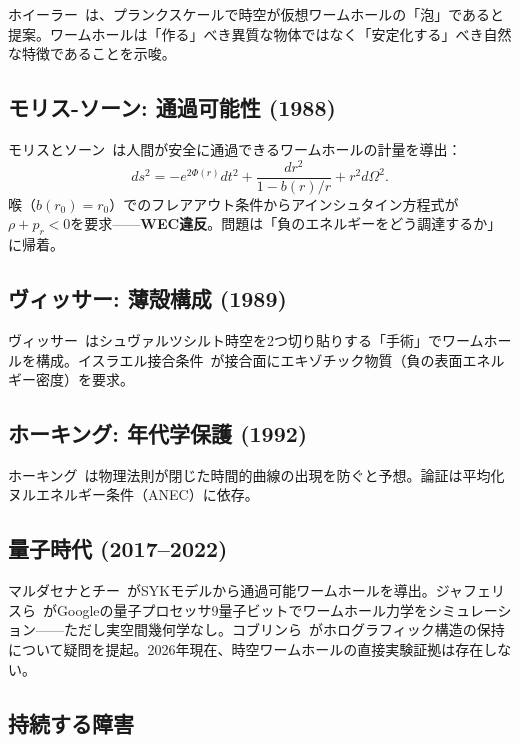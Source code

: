 \documentclass[11pt,a4paper]{article}
\begin{document}
ホイーラー~\cite{Wheeler1957}は、プランクスケールで時空が仮想ワームホールの「泡」であると提案。ワームホールは「作る」べき異質な物体ではなく「安定化する」べき自然な特徴であることを示唆。

\subsection{モリス-ソーン: 通過可能性 (1988)}

モリスとソーン~\cite{MorrisThorne1988}は人間が安全に通過できるワームホールの計量を導出：
\begin{equation}
  ds^2 = -e^{2\Phi(r)}dt^2 + \frac{dr^2}{1-b(r)/r} + r^2 d\Omega^2.
\end{equation}
喉（$b(r_0)=r_0$）でのフレアアウト条件からアインシュタイン方程式が$\rho + p_r < 0$を要求——\textbf{WEC違反}。問題は「負のエネルギーをどう調達するか」に帰着。

\subsection{ヴィッサー: 薄殻構成 (1989)}

ヴィッサー~\cite{Visser1989}はシュヴァルツシルト時空を2つ切り貼りする「手術」でワームホールを構成。イスラエル接合条件~\cite{Israel1966}が接合面にエキゾチック物質（負の表面エネルギー密度）を要求。

\subsection{ホーキング: 年代学保護 (1992)}

ホーキング~\cite{Hawking1992}は物理法則が閉じた時間的曲線の出現を防ぐと予想。論証は平均化ヌルエネルギー条件（ANEC）に依存。

\subsection{量子時代 (2017--2022)}

マルダセナとチー~\cite{MaldacenaQi2018}がSYKモデルから通過可能ワームホールを導出。ジャフェリスら~\cite{Jafferis2022}がGoogleの量子プロセッサ9量子ビットでワームホール力学をシミュレーション——ただし実空間幾何学なし。コブリンら~\cite{Kobrin2023}がホログラフィック構造の保持について疑問を提起。2026年現在、時空ワームホールの直接実験証拠は存在しない。

\subsection{持続する障害}
\end{document}
